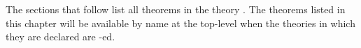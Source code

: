 \label{theorems}

The sections that follow list all theorems in the theory .
The theorems listed in this chapter will be available by name at the
top-level when the theories in which they are declared are
-ed.

